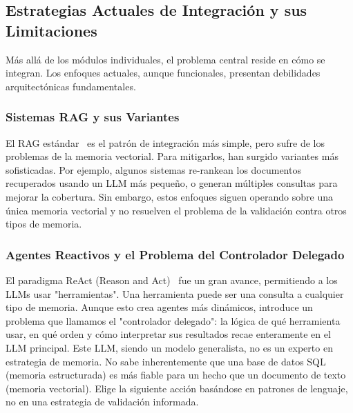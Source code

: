 \documentclass[conference]{IEEEtran}
\begin{document}
\subsection{Estrategias Actuales de Integración y sus Limitaciones}
Más allá de los módulos individuales, el problema central reside en cómo se integran. Los enfoques actuales, aunque funcionales, presentan debilidades arquitectónicas fundamentales.

\subsubsection{Sistemas RAG y sus Variantes}
El RAG estándar~\cite{lewis2020retrieval} es el patrón de integración más simple, pero sufre de los problemas de la memoria vectorial. Para mitigarlos, han surgido variantes más sofisticadas. Por ejemplo, algunos sistemas re-rankean los documentos recuperados usando un LLM más pequeño, o generan múltiples consultas para mejorar la cobertura. Sin embargo, estos enfoques siguen operando sobre una única memoria vectorial y no resuelven el problema de la validación contra otros tipos de memoria.

\subsubsection{Agentes Reactivos y el Problema del Controlador Delegado}
El paradigma ReAct (Reason and Act)~\cite{yao2022react} fue un gran avance, permitiendo a los LLMs usar "herramientas". Una herramienta puede ser una consulta a cualquier tipo de memoria. Aunque esto crea agentes más dinámicos, introduce un problema que llamamos el "controlador delegado": la lógica de qué herramienta usar, en qué orden y cómo interpretar sus resultados recae enteramente en el LLM principal. Este LLM, siendo un modelo generalista, no es un experto en estrategia de memoria. No sabe inherentemente que una base de datos SQL (memoria estructurada) es más fiable para un hecho que un documento de texto (memoria vectorial). Elige la siguiente acción basándose en patrones de lenguaje, no en una estrategia de validación informada.
\end{document}
